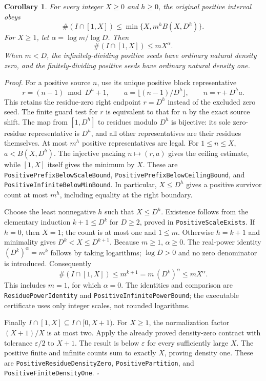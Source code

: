 \documentclass[11pt,letterpaper]{article}
\newtheorem{corollary}[theorem]{Corollary}
\newenvironment{proof}{\noindent\textit{Proof.}}{\hfill\(\square\)}
\begin{document}
\begin{corollary}\label{CorollaryPositive}
For every integer \(X\ge0\) and \(h\ge0\), the original positive interval obeys
\[
\#(I\cap[1,X])\le \min\{X,m^hB(X,D^h)\}.
\]
For \(X\ge1\), let \(\alpha=\log m/\log D\). Then
\[
\#(I\cap[1,X])\le mX^{\alpha}.
\]
When \(m<D\), the infinitely-dividing positive seeds have ordinary natural density
zero, and the finitely-dividing positive seeds have ordinary natural density one.
\end{corollary}
\begin{proof}
For a positive source \(n\), use its unique positive block representative
\[
r=(n-1)\bmod D^h+1,\qquad a=\lfloor(n-1)/D^h\rfloor,
\qquad n=r+D^ha.
\]
This retains the residue-zero right endpoint \(r=D^h\) instead of the excluded zero seed.
The finite guard test for \(r\) is equivalent to that for \(n\) by the exact source shift.
The map from \([1,D^h]\) to residues modulo \(D^h\) is bijective:
its sole zero-residue representative is \(D^h\), and all other representatives
are their residues themselves.
At most \(m^h\) positive representatives are legal.
For \(1\le n\le X\), \(a<B(X,D^h)\).
The injective packing \(n\mapsto(r,a)\) gives the ceiling estimate,
while \([1,X]\) itself gives the minimum by \(X\).
These are \texttt{PositivePrefixBelow\allowbreak{}ScaleBound},
\texttt{PositivePrefixBelow\allowbreak{}CeilingBound}, and
\texttt{PositiveInfiniteBelowMinBound}.
In particular, \(X\le D^h\) gives a positive survivor count at most \(m^h\),
including equality at the right boundary.

Choose the least nonnegative \(h\) such that \(X\le D^h\).
Existence follows from the elementary induction \(k+1\le D^k\) for \(D\ge2\),
proved in \texttt{PositiveScaleExists}.
If \(h=0\), then \(X=1\); the count is at most one and \(1\le m\).
Otherwise \(h=k+1\) and minimality gives \(D^k<X\le D^{k+1}\).
Because \(m\ge1\), \(\alpha\ge0\).
The real-power identity \((D^k)^{\alpha}=m^k\) follows by taking logarithms;
\(\log D>0\) and no zero denominator is introduced.
Consequently
\[
\#(I\cap[1,X])\le m^{k+1}=m\,(D^k)^{\alpha}\le mX^{\alpha}.
\]
This includes \(m=1\), for which \(\alpha=0\).
The identities and comparison are \texttt{ResiduePowerIdentity} and
\texttt{PositiveInfinitePowerBound}; the executable certificate uses only
integer scales, not rounded logarithms.

Finally \(I\cap[1,X]\subseteq I\cap[0,X+1)\).
For \(X\ge1\), the normalization factor \((X+1)/X\) is at most two.
Apply the already proved density-zero contract with tolerance \(\varepsilon/2\)
to \(X+1\). The result is below \(\varepsilon\) for every sufficiently large \(X\).
The positive finite and infinite counts sum to exactly \(X\), proving density one.
These are \texttt{PositiveResidueDensityZero}, \texttt{PositivePartition},
and \texttt{PositiveFiniteDensityOne}.
\end{proof}
\end{document}
